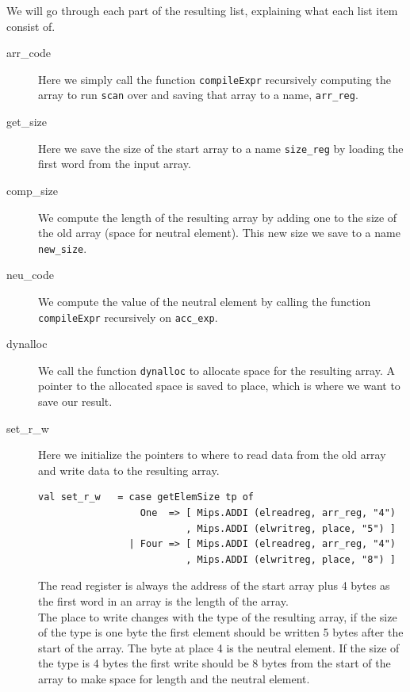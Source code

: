 \documentclass[11pt]{article}
\begin{document}
    We will go through each part of the resulting list, explaining what each
    list item consist of.

    \begin{description}
        \item [arr\_code] Here we simply call the function \texttt{compileExpr}
            recursively computing the array to run \texttt{scan} over and saving
            that array to a name, \texttt{arr\_reg}.

        \item [get\_size] Here we save the size of the start array to a name
            \texttt{size\_reg} by loading the first word from the input array.

        \item [comp\_size] We compute the length of the resulting array by
            adding one to the size of the old array (space for neutral element).
            This new size we save to a name \texttt{new\_size}.

        \item [neu\_code] We compute the value of the neutral element by calling
            the function \texttt{compileExpr} recursively on \texttt{acc\_exp}.

        \item [dynalloc] We call the function \texttt{dynalloc} to allocate
            space for the resulting array.  A pointer to the allocated space is
            saved to place, which is where we want to save our result.

        \item [set\_r\_w] Here we initialize the pointers to where to read data
            from the old array and write data to the resulting array.

            \begin{lstlisting}[basicstyle=\small]
val set_r_w   = case getElemSize tp of
                  One  => [ Mips.ADDI (elreadreg, arr_reg, "4")
                          , Mips.ADDI (elwritreg, place, "5") ]
                | Four => [ Mips.ADDI (elreadreg, arr_reg, "4")
                          , Mips.ADDI (elwritreg, place, "8") ]
            \end{lstlisting}

            The read register is always the address of the start array plus 4
            bytes as the first word in an array is the length of the array. \\

            The place to write changes with the type of the resulting array, if
            the size of the type is one byte the first element should be written
            5 bytes after the start of the array.  The byte at place 4 is the
            neutral element.  If the size of the type is 4 bytes the first write
            should be 8 bytes from the start of the array to make space for
            length and the neutral element.


\end{description}
\end{document}
